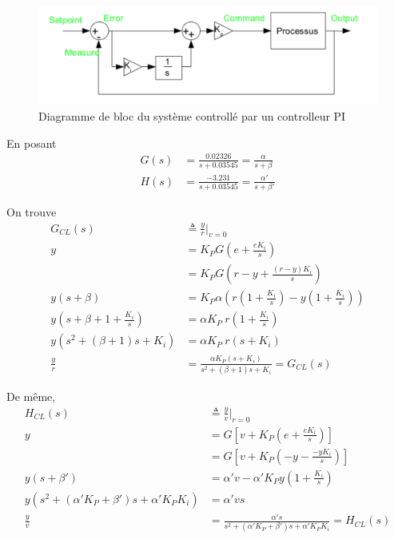 \documentclass[frenchb, paper=a4, fontsize=11pt]{scrartcl}
\numberwithin{equation}{section}					%
\numberwithin{figure}{section}					%
\numberwithin{table}{section}						%
\begin{document}
\begin{figure}[!ht]
	\centering
	\includegraphics[width=\linewidth]{img/closed_loop.png}
	\caption{Diagramme de bloc du système controllé par un controlleur PI}
	\label{fig:closed_loop}
\end{figure}



En posant 
\begin{align}
G(s) &=  \frac{0.02326}{s+0.03545} = \frac{\alpha}{s+\beta}\\
H(s) &= \frac{-3.231}{s+0.03545} = \frac{\alpha'}{s+\beta'}
\end{align}

On trouve
\begin{align}
G_{CL}(s) & \triangleq \frac{y}{r}\rvert_{v=0}\\
y &= K_P G \left(e+\frac{eK_i}{s} \right)\\
& = K_P G\left(r-y+\frac{(r-y)K_i}{s} \right)\\
y(s+\beta) & = K_P \alpha \left( r(1+\frac{K_i}{s}) - y(1+\frac{K_i}{s})\right)\\
y(s+\beta + 1 + \frac{K_i}{s}) & = \alpha K_P  \ r \left(1+\frac{K_i}{s} \right) \\
y(s^2 +(\beta+1)s + K_i) & = \alpha K_P  \ r \left(s+K_i \right) \\
\frac{y}{r}&= \frac{\alpha K_P  (s+K_i )}{s^2 +(\beta+1)s + K_i} = G_{CL}(s)
\end{align}



De même,
\begin{align}
H_{CL}(s) & \triangleq \frac{y}{v}\rvert_{r=0}\\
y &= G\left[v+K_P (e+\frac{eK_i}{s})\right]\\
&= G\left[ v + K_P(-y-\frac{-yK_i}{s})\right] \\
y(s+\beta') &= \alpha' v - \alpha' K_P y (1+\frac{K_i}{s})\\
y(s^2 + (\alpha'K_P+\beta')s + \alpha' K_P K_i) &= \alpha'v s\\
\frac{y}{v} & = \frac{\alpha' s}{s^2 + (\alpha'K_P+\beta')s + \alpha' K_P K_i} = H_{CL}(s)
\end{align}
\end{document}
